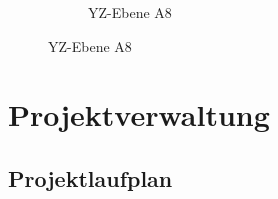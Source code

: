 \begin{appendix}
\begin{landscape}
\begin{figure}[!ht]
\begin{subfigure}[t]{0.5\textwidth}
				\caption{YZ-Ebene A8}
	\end{subfigure}      
\end{figure}
\end{landscape}
%
%
%
%
\chapter{Projektverwaltung}
\section{Projektlaufplan}
\begin{landscape}
	\label{sec:projectplan}
	\scalebox{.70}{
		
		}
\end{landscape}
%

\end{appendix}
